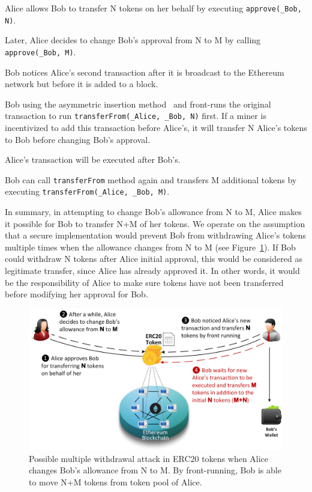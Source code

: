 \begin{compactlistn}
	\item Alice allows Bob to transfer N tokens on her behalf by executing \texttt{approve(\_Bob, N)}.
	\item Later, Alice decides to change Bob's approval from N to M by calling \texttt{approve(\_Bob, M)}.
	\item Bob notices Alice's second transaction after it is broadcast to the Ethereum network but before it is added to a block.
	\item Bob using the asymmetric insertion method~\cite{eskandari2019sok} and front-runs the original transaction to run  \texttt{transferFrom(\_Alice, \_Bob, N)} first. If a miner is incentivized to add this transaction before Alice's, it will transfer N Alice's tokens to Bob before changing Bob's approval.
	\item Alice's transaction will be executed after Bob's.
	\item Bob can call \texttt{transferFrom} method again and transfers M additional tokens by executing \texttt{transferFrom(\_Alice, \_Bob, M)}.
\end{compactlistn}
In summary, in attempting to change Bob's allowance from N to M, Alice makes it possible for Bob to transfer N+M of her tokens. We operate on the assumption that a secure implementation would prevent Bob from withdrawing Alice's tokens multiple times when the allowance changes from N to M (see Figure~\ref{fig:mwa}). If Bob could withdraw N tokens after Alice initial approval, this would be considered as legitimate transfer, since Alice has already approved it. In other words, it would be the responsibility of Alice to make sure tokens have not been transferred before modifying her approval for Bob.
\begin{figure}[t!]
	\centering
	\includegraphics[width=1.0\linewidth]{figures/multiple_withdrawal_02.png}
	\caption{Possible multiple withdrawal attack in ERC20 tokens when Alice changes Bob's allowance from N to M. By front-running, Bob is able to move N+M tokens from token pool of Alice.\label{fig:mwa}}
\end{figure}

